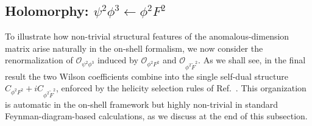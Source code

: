 \subsection{\texorpdfstring{Holomorphy: $\psi^2 \phi^3 \leftarrow \phi^2 F^2$}{Holomorphy: psi2phi3 from phi2F2}}
\label{sec:ex_psi2phi3}

To illustrate how non-trivial structural features of the anomalous-dimension matrix arise
naturally in the on-shell formalism, we now consider the renormalization of
$\mathcal{O}_{\psi^2\phi^3}$ induced by $\mathcal{O}_{\phi^2 F^2}$ and
$\mathcal{O}_{\phi^2 \widetilde F^2}$.
As we shall see, in the final result the two Wilson coefficients combine into the single
self-dual structure $C_{\phi^2 F^2} + i C_{\phi^2 \widetilde F^2}$, enforced by the helicity
selection rules of Ref.~\cite{Cheung:2015aba}.
This organization is automatic in the on-shell framework but highly non-trivial in standard
Feynman-diagram-based calculations, as we discuss at the end of this subsection.

